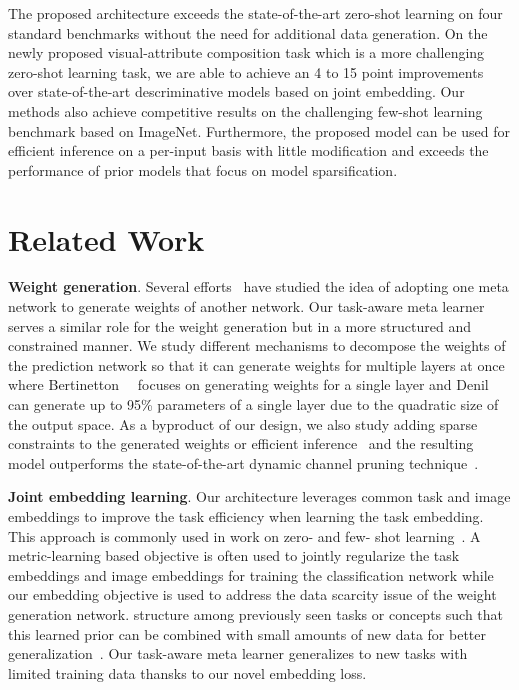\documentclass[10pt,twocolumn,letterpaper]{article}
\newcommand\minisection[1]{\vspace{2mm}\noindent \textbf{#1}}
\begin{document}
The proposed architecture exceeds the state-of-the-art zero-shot learning on four standard benchmarks without the need for additional data generation. On the newly proposed visual-attribute composition task which is a more challenging zero-shot learning task, 
we are able to achieve an 4 to 15 point improvements over state-of-the-art descriminative models based on joint embedding. Our methods also achieve competitive results on the challenging few-shot learning benchmark based on ImageNet. Furthermore, the proposed model can be used for efficient inference
on a per-input basis with little modification 
and exceeds the performance of prior models that focus on model sparsification. 

\section{Related Work}\minisection{Weight generation}. Several efforts~\cite{bertinetto2016learning, ha2016hypernetworks,denil2013predicting} have studied the idea of adopting one  meta network to generate weights of another network. Our task-aware meta learner serves a similar role for the weight generation 
but in a more structured and constrained manner. We study different mechanisms to decompose the weights of the prediction network so that it can generate weights for multiple layers at once where Bertinetton~\etal~\cite{bertinetto2016learning} 
focuses on generating weights for a single layer and Denil~\etal~\cite{denil2013predicting} can generate up to 95\% parameters of a single layer due to the quadratic size of the output space. As a byproduct of our design, we also study adding sparse constraints to the generated weights or efficient inference~\cite{lin2017runtime, wang2017skipnet, wu2018blockdrop} and the resulting model outperforms the state-of-the-art dynamic channel pruning technique~\cite{lin2017runtime}.

\minisection{Joint embedding learning}. Our architecture leverages common task and 
image embeddings to improve the task efficiency when learning the task 
embedding. This approach is commonly used in work on zero- and few- shot learning~\cite{koch2015siamese, yang2018learning, vinyals2016matching, zhang2016zero, Changpinyo_2016_CVPR, frome2013devise}. 
A metric-learning based objective \cite{koch2015siamese, yang2018learning, vinyals2016matching} is often used to jointly regularize the task embeddings and 
image embeddings for training the classification network while our embedding objective is 
used to address the data scarcity issue of the weight generation network.
structure among previously seen tasks or concepts such that this learned prior can be combined with small amounts of new data for better generalization~\cite{finn2018learning}.  
Our task-aware meta learner generalizes to new tasks with limited training data 
thansks to our novel embedding loss. 
\end{document}
